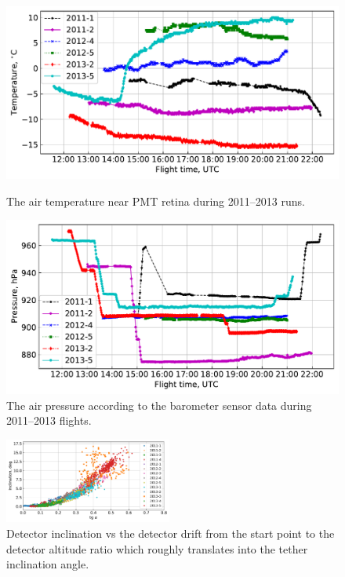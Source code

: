 \documentclass[final,5p,times,twocolumn]{elsarticle}
\begin{document}
\begin{figure}[tb]
    \begin{minipage}[t]{0.48\textwidth}
    \centering
    \includegraphics[width=\textwidth]{Telemetry_tmos.pdf}
    \caption{The air temperature near PMT retina during 2011--2013 runs.}
    \label{fig:temperature}
    \end{minipage}
    \hfill
    \begin{minipage}[t]{0.48\textwidth}
    \centering
    \includegraphics[width=\textwidth]{Telemetry_pressure.pdf}
    \caption{The air pressure according to the barometer sensor data  during 2011--2013 flights.}
    \label{fig:pressure}
    \end{minipage}
\end{figure}


\begin{figure}[tb]
    \includegraphics[width=0.49\textwidth]{tg-inclination.pdf}
    \caption{Detector inclination vs the detector drift from the start point to the detector altitude ratio which roughly translates into the tether inclination angle.}
\label{fig:drift-inclination}
\end{figure}
\end{document}
